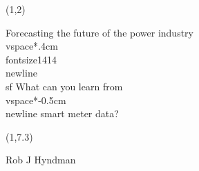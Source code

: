 \usepackage{MonashBlue,bm,fancyvrb,animate,multicol}

{
\begin{textblock}{7.3}(1,2)\fontsize{22}{28}\sf
{\color{white}\raggedright{}\par
Forecasting the future of the power industry\\vspace*{.4cm}\\fontsize{14}{14}\\newline\\sf What can you learn from\\vspace*{-0.5cm}\\newline smart meter data?}
\end{textblock}
\begin{textblock}{7.3}(1,7.3)
{\raggedright{\alert{Rob J Hyndman}}\\[0.2cm]
\insertdate}
\end{textblock}}

\graphicspath{{figs/}}



\def\pred#1#2#3{\hat{#1}_{#2|#3}}
\def\damped{$_\text{d}$}
\def\h+{h_{m}^{+}}
\def\st#1{\rlap{#1}\textcolor{red}{\rule{1cm}{0.1cm}}}

\setlength{\emergencystretch}{0em}
\setlength{\parskip}{0pt}
\def\fullwidth#1{\vspace*{-0.1cm}\par\centerline{\texttt{[image: \#1]}}}
\def\fullheight#1{\vspace*{-0.1cm}\par\centerline{\texttt{[image: \#1]}}}

\fontsize{13}{15}\sf
\usepackage[scale=0.85]{sourcecodepro}
\usepackage[lf,t]{carlito}

\def\pred#1#2#3{\hat{#1}_{#2|#3}}
\def\h+{h_{m}^{+}}
\def\NID{\stackrel{\mbox{\scriptsize iid}}{\sim}\mbox{N}}
\def\var{\text{Var}}
\def\E{\text{E}}
\def\damped{$_{\text{\footnotesize d}}$}
\def\logN{\text{logN}}
\def\N{\text{N}}
\def\bbeta{\bm{\beta}}
\def\by{\bm{y}}
\def\bS{\bm{S}}
\def\bJ{\bm{J}}
\def\bSigma{\bm{W}}
\def\bOmega{\bm{\Omega}}
\def\bLambda{\bm{\Lambda}}
\def\mc{\multicolumn}
\def\0{\phantom{0}}
\def\bI{\text{\rm\textbf{I}}}

